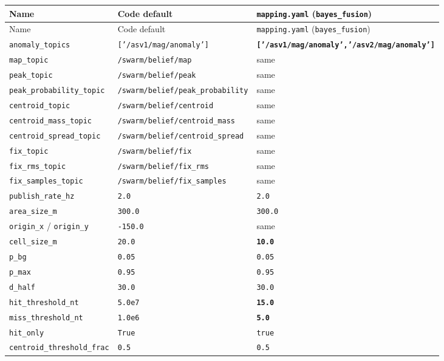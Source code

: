 \begin{center}
\small
\begin{longtable}{@{}llp{7.2cm}@{}}
\toprule
Name & Code default & \texttt{mapping.yaml} (\texttt{bayes\_fusion}) \\
\midrule
\endfirsthead
\toprule
Name & Code default & \texttt{mapping.yaml} (\texttt{bayes\_fusion}) \\
\midrule
\endhead
\texttt{anomaly\_topics} & \texttt{['/asv1/mag/anomaly']} & \textbf{\texttt{['/asv1/mag/anomaly','/asv2/mag/anomaly']}} \\
\texttt{map\_topic} & \texttt{/swarm/belief/map} & same \\
\texttt{peak\_topic} & \texttt{/swarm/belief/peak} & same \\
\texttt{peak\_probability\_topic} & \texttt{/swarm/belief/peak\_probability} & same \\
\texttt{centroid\_topic} & \texttt{/swarm/belief/centroid} & same \\
\texttt{centroid\_mass\_topic} & \texttt{/swarm/belief/centroid\_mass} & same \\
\texttt{centroid\_spread\_topic} & \texttt{/swarm/belief/centroid\_spread} & same \\
\texttt{fix\_topic} & \texttt{/swarm/belief/fix} & same \\
\texttt{fix\_rms\_topic} & \texttt{/swarm/belief/fix\_rms} & same \\
\texttt{fix\_samples\_topic} & \texttt{/swarm/belief/fix\_samples} & same \\
\texttt{publish\_rate\_hz} & \texttt{2.0} & \texttt{2.0} \\
\texttt{area\_size\_m} & \texttt{300.0} & \texttt{300.0} \\
\texttt{origin\_x} / \texttt{origin\_y} & \texttt{-150.0} & same \\
\texttt{cell\_size\_m} & \texttt{20.0} & \textbf{\texttt{10.0}} \\
\texttt{p\_bg} & \texttt{0.05} & \texttt{0.05} \\
\texttt{p\_max} & \texttt{0.95} & \texttt{0.95} \\
\texttt{d\_half} & \texttt{30.0} & \texttt{30.0} \\
\texttt{hit\_threshold\_nt} & \texttt{5.0e7} & \textbf{\texttt{15.0}} \\
\texttt{miss\_threshold\_nt} & \texttt{1.0e6} & \textbf{\texttt{5.0}} \\
\texttt{hit\_only} & \texttt{True} & \texttt{true} \\
\texttt{centroid\_threshold\_frac} & \texttt{0.5} & \texttt{0.5} \\

\end{longtable}
\end{center}
